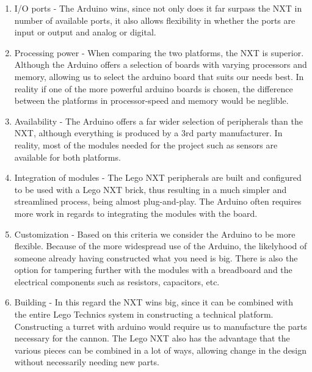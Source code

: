 \begin{enumerate}
  \item I/O ports - The Arduino wins, since not only does it far surpass
  the NXT in number of available ports, it also allows flexibility in
  whether the ports are input or output and analog or digital.
  \item Processing power - When comparing the two platforms, the NXT is
  superior. Although the Arduino offers a selection of boards with varying
  processors and memory, allowing us to select the arduino board that suits our
  needs best. In reality if one of the more powerful arduino boards is chosen,
  the difference between the platforms in processor-speed and memory would be
  neglible.
  \item Availability - The Arduino offers a far wider selection of peripherals
  than the NXT, although everything is produced by a 3rd party manufacturer. In
  reality, most of the modules needed for the project such as sensors are
  available for both platforms.
  \item Integration of modules - The Lego NXT peripherals are built and
  configured to be used with a Lego NXT brick, thus resulting in a much simpler
  and streamlined process, being almost plug-and-play. The Arduino often
  requires more work in regards to integrating the modules with the board.
  \item Customization - Based on this criteria we consider the Arduino to be
  more flexible. Because of the more widespread use of the Arduino, the
  likelyhood of someone already having constructed what you need is big. There
  is also the option for tampering further with the modules with a breadboard
  and the electrical components such as resistors, capacitors, etc.
  \item Building - In this regard the NXT wins big, since it can be combined
  with the entire Lego Technics system in constructing a technical platform.
  Constructing a turret with arduino would require us to manufacture the parts
  necessary for the cannon. The Lego NXT also has the advantage that the various
  pieces can be combined in a lot of ways, allowing change in the design
  without necessarily needing new parts.
\end{enumerate}

